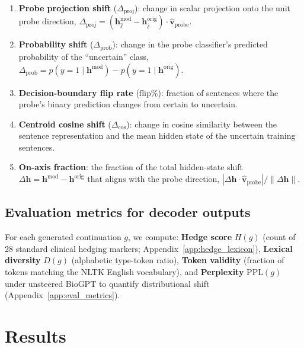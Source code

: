 \documentclass[11pt,a4paper]{article}
\begin{document}
\begin{enumerate}
\item \textbf{Probe projection shift} ($\Delta_{\text{proj}}$): change in
  scalar projection onto the unit probe direction,
  $\Delta_{\text{proj}} = (\mathbf{h}_{\hat{\ell}}^{\text{mod}} -
  \mathbf{h}_{\hat{\ell}}^{\text{orig}}) \cdot \hat{\mathbf{v}}_{\text{probe}}$.

\item \textbf{Probability shift} ($\Delta_{\text{prob}}$): change in the
  probe classifier's predicted probability of the ``uncertain'' class,
  $\Delta_{\text{prob}} = p(y{=}1 \mid \mathbf{h}^{\text{mod}}) -
  p(y{=}1 \mid \mathbf{h}^{\text{orig}})$.

\item \textbf{Decision-boundary flip rate} ($\text{flip}\%$): fraction of
  sentences where the probe's binary prediction changes from certain to
  uncertain.

\item \textbf{Centroid cosine shift} ($\Delta_{\text{cos}}$): change in
  cosine similarity between the sentence representation and the mean
  hidden state of the uncertain training sentences.

\item \textbf{On-axis fraction}: the fraction of the total hidden-state
  shift $\Delta\mathbf{h} = \mathbf{h}^{\text{mod}} - \mathbf{h}^{\text{orig}}$
  that aligns with the probe direction,
  $|\Delta\mathbf{h} \cdot \hat{\mathbf{v}}_{\text{probe}}| /
  \|\Delta\mathbf{h}\|$.
\end{enumerate}

\subsection{Evaluation metrics for decoder outputs}

For each generated continuation $g$, we compute: \textbf{Hedge score}
$H(g)$ (count of 28 standard clinical hedging markers;
Appendix~\ref{app:hedge_lexicon}), \textbf{Lexical diversity} $D(g)$
(alphabetic type-token ratio), \textbf{Token validity} (fraction of
tokens matching the NLTK English vocabulary), and \textbf{Perplexity}
$\mathrm{PPL}(g)$ under unsteered BioGPT to quantify distributional
shift (Appendix~\ref{app:eval_metrics}).

\section{Results}
\end{document}
